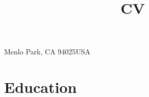\documentclass[11pt,a4paper,sans]{moderncv}        %
\begin{document}
%
%
%
%


\title{CV}  %
\address{2575 Sandhill Road}{Menlo Park, CA 94025}{USA}%
\makecvtitle

\section{Education}

\iffalse
\section{Ph.D Thesis}
\cvitem{Title}{\emph{Design for  Staged Two Beam Acceleration at the Argonne Wakefield Accelerator}}
\cvitem{Advisors}{Linda Spentzouris, John Power}
\cvitem{Summary}{
	I discuss beam line design, simulation, and optimization, of a
	beam line with the potential for dielectric two beam acceleration.
    Preliminary and prepratory experimental measurements
    are included.    }
\fi
\end{document}
